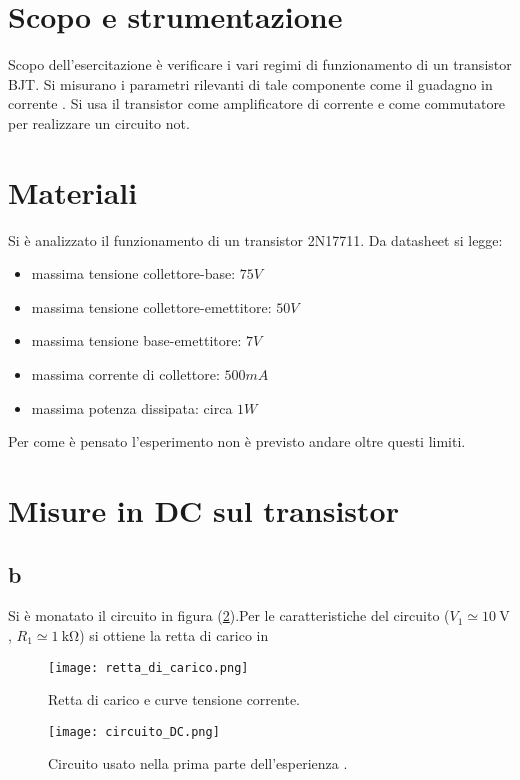 
\section{Scopo e strumentazione}
Scopo dell'esercitazione è verificare i vari regimi di funzionamento di un transistor BJT. Si misurano i parametri rilevanti di tale componente come il guadagno in corrente . Si usa il transistor come amplificatore di corrente e come commutatore per realizzare un circuito not.

\section{Materiali}
Si è analizzato il funzionamento di un transistor 2N17711. Da datasheet si legge:

\begin{itemize}
\item massima tensione collettore-base: $75 V$
\item massima tensione collettore-emettitore: $50 V$
\item massima tensione base-emettitore: $7 V$
\item massima corrente di collettore: $500 mA$
\item massima potenza dissipata: circa $1 W$
\end{itemize}
Per come è pensato l'esperimento non è previsto andare oltre questi limiti. 


\section{Misure in DC sul transistor}
\subsection{b}
Si è monatato il circuito in figura (\ref{f:circuito DC}).Per le caratteristiche del circuito ($V_1\simeq \SI{10}{\volt}$, $R_1\simeq \SI{1}{\kilo\ohm}$) si ottiene la retta di carico in 
\begin{figure}
	\centering
	\texttt{[image: retta\_di\_carico.png]}
	\caption{Retta di carico e curve tensione corrente.\label{f:retta di carico}}
\end{figure}

\begin{figure}
	\centering
	\texttt{[image: circuito\_DC.png]}
	\caption{Circuito usato nella prima parte dell'esperienza .\label{f:circuito DC}}
\end{figure}



